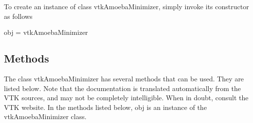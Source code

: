 To create an instance of class vtk\-Amoeba\-Minimizer, simply invoke its constructor as follows \begin{DoxyVerb}  obj = vtkAmoebaMinimizer
\end{DoxyVerb}
 \hypertarget{vtkwidgets_vtkxyplotwidget_Methods}{}\subsection{Methods}\label{vtkwidgets_vtkxyplotwidget_Methods}
The class vtk\-Amoeba\-Minimizer has several methods that can be used. They are listed below. Note that the documentation is translated automatically from the V\-T\-K sources, and may not be completely intelligible. When in doubt, consult the V\-T\-K website. In the methods listed below, {\ttfamily obj} is an instance of the vtk\-Amoeba\-Minimizer class. 
